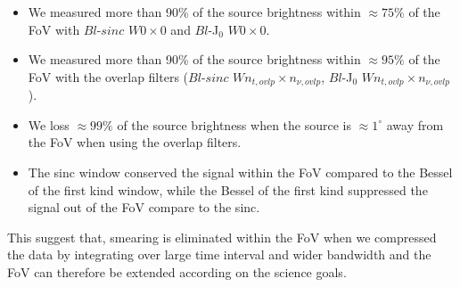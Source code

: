 \documentclass[useAMS,usenatbib]{mn2e}
\begin{document}
\begin{itemize}
 \item We measured more than 90\% of the source brightness within $\approx 75\%$ of the FoV with $Bl$-$sinc$ $W0 \times 0$ and 
      $Bl$-J$_0$ $W0\times0$. 
 \item We measured more than 90\% of the source brightness within $\approx 95\%$ of the FoV with the overlap filters ($Bl$-$sinc$ 
     $W n_{t,ovlp} \times n_{\nu,ovlp}$, $Bl$-J$_0$ $W n_{t,ovlp} \times n_{\nu,ovlp}$).
 \item We loss $\approx 99\%$ of the source brightness when the source is $\approx 1^{\circ}$ away from the FoV when using the overlap 
filters.
  \item The sinc window conserved the signal within the FoV compared to the Bessel of the first kind window, while the Bessel of the first 
kind suppressed the signal out of the FoV compare to the sinc.
\end{itemize}
This suggest that, smearing is eliminated within the FoV when we compressed the data by integrating over large time interval and wider 
bandwidth and the FoV can therefore be extended according on the science goals.
\end{document}
